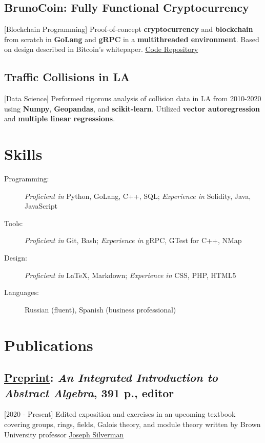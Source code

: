 \documentclass{mycv}
\begin{document}
\subsection{BrunoCoin: Fully Functional Cryptocurrency}[Blockchain Programming]
Proof-of-concept \textbf{cryptocurrency} and \textbf{blockchain} from scratch in \textbf{GoLang} and \textbf{gRPC} in a \textbf{multithreaded environment}. Based on design described in Bitcoin's whitepaper. \href{https://github.com/alizma/BrunoCoin}{\underline{Code Repository}}

\subsection{Traffic Collisions in LA}[Data Science]
Performed rigorous analysis of collision data in LA from 2010-2020 using \textbf{Numpy}, \textbf{Geopandas}, and \textbf{scikit-learn}. Utilized \textbf{vector autoregression} and \textbf{multiple linear regressions}.



\section{Skills}

\begin{description}
  \item[Programming:] \textit{Proficient in} Python, GoLang, C++, SQL; \textit{Experience in} Solidity, Java, JavaScript
  \item[Tools:] \textit{Proficient in} Git, Bash; \textit{Experience in} gRPC, GTest for C++, NMap 
  \item[Design:] \textit{Proficient in} \LaTeX, Markdown; \textit{Experience in} CSS, PHP, HTML5 
  \item[Languages:] Russian (fluent), Spanish (business professional) 

\end{description}


\section{Publications}
\subsection{\underline{Preprint}: \textit{An Integrated Introduction to Abstract Algebra}, 391 p., editor}[2020 - Present] 
Edited exposition and exercises in an upcoming textbook covering groups, rings, fields, Galois theory, and module theory written by Brown University professor \href{http://www.math.brown.edu/johsilve/}{\underline{Joseph Silverman}}
\end{document}
